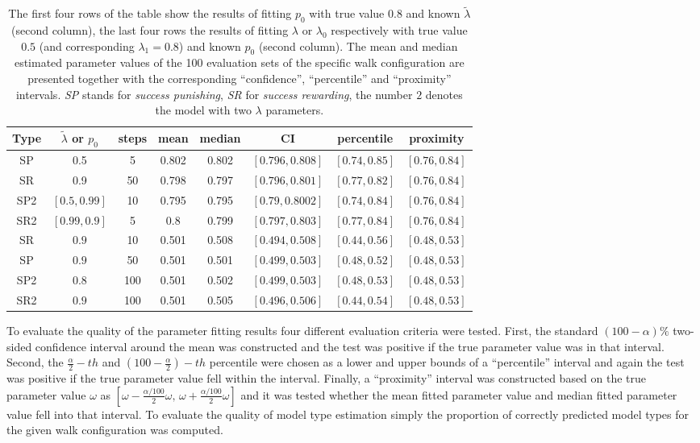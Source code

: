 \documentclass{amsart}
\theoremstyle{definition}
\theoremstyle{plain}
\theoremstyle{plain}
\theoremstyle{plain}
\numberwithin{equation}{section}
\begin{document}
\begin{table}
\begin{centering}
{\caption{\label{tab:Fitting-results} The first four rows of the table show the results of fitting $p_0$ with true value $0.8$ and known $\tilde{\lambda}$ (second column), the last four rows the results of fitting $\lambda$ or $\lambda_0$ respectively with true value $0.5$ (and corresponding $\lambda_1=0.8$) and known $p_0$ (second column). The mean and median {\color{red}estimated parameter} values of the 100 {\color{red}evaluation sets}  of the specific walk configuration are presented together with the corresponding ``confidence'', ``percentile'' and ``proximity'' intervals.  \emph{SP }stands for \emph{success punishing}, \emph{SR} for \emph{success rewarding}, the number $2$ denotes the model with two $\lambda$ parameters.}}
\begin{tabular}{|c|c|c|c|c|c|c|c|}
\hline
 Type & $\tilde{\lambda}$ or $p_0$ & steps & mean & median & CI & percentile & proximity \tabularnewline
\hline
SP & 0.5 & 5 & 0.802 & 0.802 & $[0.796, 0.808]$ & $[0.74, 0.85]$ & $[0.76,0.84]$ \tabularnewline
\hline
SR & 0.9 & 50 & 0.798 & 0.797 & $[0.796,0.801 ]$ & $[0.77, 0.82]$ & $[0.76,0.84]$ \tabularnewline
\hline
SP2 & $[0.5,0.99]$ & 10 & 0.795 & 0.795 &$[0.79,0.8002]$  & $[0.74,0.84]$ & $[0.76,0.84]$ \tabularnewline
\hline
SR2 &  $[0.99,0.9]$ & 5 & 0.8 & 0.799 & $[0.797,0.803]$ & $[0.77,0.84]$ & $[0.76,0.84]$ \tabularnewline
\hline
\hline
SR & $0.9$ & 10 & 0.501 & 0.508 & $[0.494,0.508]$ & $[0.44,0.56]$ & $[0.48,0.53]$ \tabularnewline
\hline
SP & $0.9$ & 50 & 0.501 & 0.501 & $[0.499,0.503]$ & $[0.48,0.52]$ & $[0.48,0.53]$ \tabularnewline
\hline
SP2 & $0.8$ & 100 & 0.501 & 0.502 & $[0.499,0.503]$ & $[0.48,0.53]$ & $[0.48,0.53]$ \tabularnewline
\hline
SR2 & $0.9$ & 100 & 0.501 & 0.505 & $[0.496,0.506]$ & $[0.44,0.54]$ & $[0.48,0.53]$ \tabularnewline
\hline
\end{tabular}
\par\end{centering}
\end{table}

To evaluate the quality of the parameter fitting results four different {\color{red}evaluation} criteria were tested. First, the standard $(100-\alpha)\%$ two-sided confidence interval around the mean was constructed and the test was positive if the true parameter value was in that interval. Second, the $\frac{\alpha}{2}-th$ and $(100-\frac{\alpha}{2})-th$ percentile were chosen as a lower and upper bounds of a ``percentile'' interval and again the test was positive if the true parameter value fell within the interval. Finally, a ``proximity'' interval was constructed based on the true parameter value $\omega$ as $[\omega-\frac{\alpha/100}{2}\omega,\,\omega+\frac{\alpha/100}{2}\omega]$ and it was tested whether the mean fitted parameter value and median fitted parameter value fell into that interval. To evaluate the quality of model type estimation simply the proportion of correctly predicted model types for the given walk configuration was computed.
\end{document}
